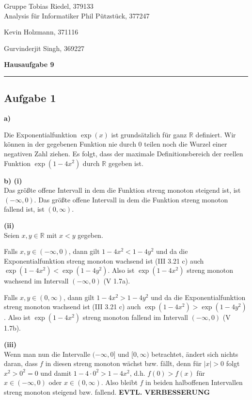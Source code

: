 \documentclass[a4paper,graphics,11pt]{article}
\newcommand{\aufgabe}[1]{\subsection*{Aufgabe #1}}
\begin{document}
\noindent Gruppe              \hfill Tobias Riedel, 379133 \\
\noindent Analysis für Informatiker             \hfill Phil Pützstück, 377247 \\
\strut\hfill Kevin Holzmann, 371116\\
\strut\hfill Gurvinderjit Singh, 369227
\begin{center}
	\LARGE{\textbf{Hausaufgabe 9}}
\end{center}
\begin{center}
\rule[0.1ex]{\textwidth}{1pt}
\end{center}



\aufgabe{1}
\textbf{a)}

Die Exponentialfunktion $\exp(x)$ ist grundsätzlich für ganz $\mathbb{R}$ definiert.
Wir können in der gegebenen Funktion nie durch 0 teilen noch die Wurzel einer
negativen Zahl ziehen. Es folgt, dass der maximale Definitionsbereich der
reellen Funktion $\exp(1-4x^2)$ durch $\mathbb{R}$ gegeben ist.

\textbf{b) (i)}\\
Das größte offene Intervall in dem die Funktion streng monoton steigend ist, ist
$(-\infty, 0)$. Das größte offene Intervall in dem die Funktion streng monoton
fallend ist, ist $(0, \infty)$.

\textbf{(ii)}\\
Seien $x,y \in \mathbb{R}$ mit $x<y$ gegeben.

Falls $x,y \in (-\infty, 0)$, dann gilt $1-4x^2 < 1-4y^2$ und da die Exponentialfunktion
streng monoton wachsend ist (III 3.21 c) auch $\exp(1-4x^2) < \exp(1-4y^2)$.
Also ist $\exp(1-4x^2)$ streng monoton wachsend im Intervall $(-\infty, 0)$ (V 1.7a).

Falls $x,y \in (0, \infty)$, dann gilt $1-4x^2 > 1-4y^2$ und da die Exponentialfunktion
streng monoton wachsend ist (III 3.21 c) auch $\exp(1-4x^2) > \exp(1-4y^2)$.
Also ist $\exp(1-4x^2)$ streng monoton fallend im Intervall $(-\infty, 0)$ (V 1.7b).

\textbf{(iii)}\\
Wenn man nun die Intervalle $(-\infty, 0]$ und $[0, \infty)$ betrachtet, ändert sich
nichts daran, dass $f$ in diesen streng monoton wächst bzw. fällt, denn für
$|x| > 0$ folgt $x^2 > 0^2 = 0$ und damit $1-4\cdot0^2 > 1-4x^2$, d.h.
$f(0) > f(x)$ für $x \in (-\infty, 0)$ oder $x \in (0, \infty)$. Also
bleibt $f$ in beiden halboffenen Intervallen streng monoton steigend bzw. fallend.
\textbf{EVTL. VERBESSERUNG}
\end{document}

